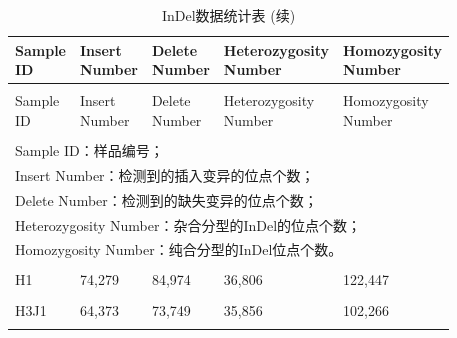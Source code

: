 \documentclass[
  a4paper,
  titlepage]{article}
\begin{document}
\begin{longtable}[t]{lllll}
\caption{\label{tab:indelstat-table}InDel数据统计表}\\
\toprule
\makecell[c]{Sample\\ID} & \makecell[c]{Insert\\Number} & \makecell[c]{Delete\\Number} & \makecell[c]{Heterozygosity\\Number} & \makecell[c]{Homozygosity\\Number}\\
\midrule
\endfirsthead
\caption[]{\label{tab:indelstat-table}InDel数据统计表 (续)}\\
\toprule
\makecell[c]{Sample\\ID} & \makecell[c]{Insert\\Number} & \makecell[c]{Delete\\Number} & \makecell[c]{Heterozygosity\\Number} & \makecell[c]{Homozygosity\\Number}\\
\midrule
\endhead
\hline
\endfoot
\bottomrule
\multicolumn{5}{l}{\rule{0pt}{1em}\textit{注：}}\\
\multicolumn{5}{l}{\rule{0pt}{1em}Sample ID：样品编号；}\\
\multicolumn{5}{l}{\rule{0pt}{1em}Insert Number：检测到的插入变异的位点个数；}\\
\multicolumn{5}{l}{\rule{0pt}{1em}Delete Number：检测到的缺失变异的位点个数；}\\
\multicolumn{5}{l}{\rule{0pt}{1em}Heterozygosity Number：杂合分型的InDel的位点个数；}\\
\multicolumn{5}{l}{\rule{0pt}{1em}Homozygosity Number：纯合分型的InDel位点个数。}\\
\endlastfoot
\cellcolor{gray!6}{FJMS} & \cellcolor{gray!6}{227,289} & \cellcolor{gray!6}{254,914} & \cellcolor{gray!6}{356,651} & \cellcolor{gray!6}{125,552}\\
 
H1 & 74,279 & 84,974 & 36,806 & 122,447\\
 
\cellcolor{gray!6}{H3} & \cellcolor{gray!6}{56,230} & \cellcolor{gray!6}{64,698} & \cellcolor{gray!6}{27,437} & \cellcolor{gray!6}{93,491}\\
 
H3J1 & 64,373 & 73,749 & 35,856 & 102,266\\
 
\cellcolor{gray!6}{H3J2} & \cellcolor{gray!6}{63,069} & \cellcolor{gray!6}{71,846} & \cellcolor{gray!6}{30,607} & \cellcolor{gray!6}{104,308}\\
 

\end{longtable}
\end{document}
